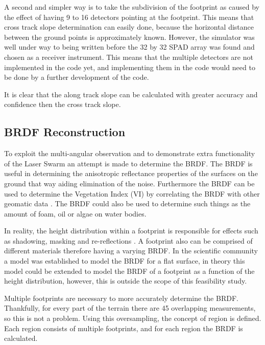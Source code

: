 A second and simpler way is to take the subdivision of the footprint as caused by the effect of having 9 to 16 detectors pointing at the footprint. This means that cross track slope determination can easily done, because the horizontal distance between the ground points is approximately known. However, the simulator was well under way to being written before the 32 by 32 \ac{SPAD} array was found and chosen as a receiver instrument. This means that the multiple detectors are not implemented in the code yet, and implementing them in the code would need to be done by a further development of the code.

It is clear that the along track slope can be calculated with greater accuracy and confidence then the cross track slope.

\subsection{\ac{BRDF} Reconstruction}
\label{sec:BRDFReconstuction}

To exploit the multi-angular observation and to demonstrate extra functionality of the Laser Swarm an attempt is made to determine the \ac{BRDF}. 
The \ac{BRDF} is useful in determining the anisotropic reflectance properties of the surfaces on the ground that way aiding elimination of the noise. Furthermore the \ac{BRDF} can be used to determine the Vegetation Index (VI) by correlating the \ac{BRDF} with other geomatic data \cite{BRDFwanner}. The \ac{BRDF} could also be used to determine such things as the amount of foam, oil or algae on water bodies.

In reality, the height distribution within a footprint is responsible for effects such as shadowing, masking and re-reflections \cite{BRDFsparrow}. A footprint also can be comprised of different materials therefore having a varying \ac{BRDF}. In the scientific community a model was established to model the \ac{BRDF} for a flat surface, in theory this model could be extended to model the \ac{BRDF} of a footprint as a function of the height distribution, however, this is outside the scope of this feasibility study. 

Multiple footprints are necessary to more accurately determine the \ac{BRDF}. Thankfully, for every part of the terrain there are 45 overlapping measurements, so this is not a problem. Using this oversampling, the concept of region is defined. Each region consists of multiple footprints, and for each region the \ac{BRDF} is calculated.

